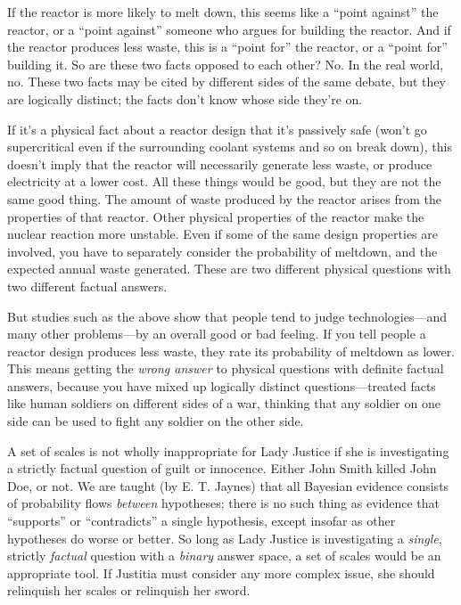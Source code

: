{
 If the reactor is more likely to melt down, this seems like a
``point against'' the reactor, or a
``point against'' someone who argues
for building the reactor. And if the reactor produces less waste, this
is a ``point for'' the reactor, or a
``point for'' building it. So are
these two facts opposed to each other? No. In the real world, no. These
two facts may be cited by different sides of the same debate, but they
are logically distinct; the facts don't know whose side
they're on.}

{
 If it's a physical fact about a reactor design
that it's passively safe (won't go
supercritical even if the surrounding coolant systems and so on break
down), this doesn't imply that the reactor will
necessarily generate less waste, or produce electricity at a lower
cost. All these things would be good, but they are not the same good
thing. The amount of waste produced by the reactor arises from the
properties of that reactor. Other physical properties of the reactor
make the nuclear reaction more unstable. Even if some of the same
design properties are involved, you have to separately consider the
probability of meltdown, and the expected annual waste generated. These
are two different physical questions with two different factual
answers.}

{
 But studies such as the above show that people tend to judge
technologies---and many other problems---by an overall good or bad
feeling. If you tell people a reactor design produces less waste, they
rate its probability of meltdown as lower. This means getting the
\textit{wrong answer} to physical questions with definite factual
answers, because you have mixed up logically distinct
questions---treated facts like human soldiers on different sides of a
war, thinking that any soldier on one side can be used to fight any
soldier on the other side.}

{
 A set of scales is not wholly inappropriate for Lady Justice if
she is investigating a strictly factual question of guilt or innocence.
Either John Smith killed John Doe, or not. We are taught (by E. T.
Jaynes) that all Bayesian evidence consists of probability flows
\textit{between} hypotheses; there is no such thing as evidence that
``supports'' or
``contradicts'' a single hypothesis,
except insofar as other hypotheses do worse or better. So long as Lady
Justice is investigating a \textit{single}, strictly \textit{factual}
question with a \textit{binary} answer space, a set of scales would be
an appropriate tool. If Justitia must consider any more complex issue,
she should relinquish her scales or relinquish her sword.}

